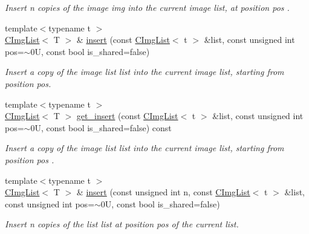 \begin{Indent}
\begin{DoxyCompactItemize}
\begin{DoxyCompactList}\small\item\em Insert {\ttfamily n} copies of the image {\ttfamily img} into the current image list, at position {\ttfamily pos} . \end{DoxyCompactList}\item 
{\footnotesize template$<$typename t $>$ }\\\hyperlink{structcimg__library__suffixed_1_1CImgList}{C\+Img\+List}$<$ T $>$ \& \hyperlink{structcimg__library__suffixed_1_1CImgList_a2f3f5778b146d1e2442b9a1fecf7f17b}{insert} (const \hyperlink{structcimg__library__suffixed_1_1CImgList}{C\+Img\+List}$<$ t $>$ \&list, const unsigned int pos=$\sim$0\+U, const bool is\+\_\+shared=false)
\begin{DoxyCompactList}\small\item\em Insert a copy of the image list {\ttfamily list} into the current image list, starting from position {\ttfamily pos}. \end{DoxyCompactList}\item 
\mbox{\label{structcimg__library__suffixed_1_1CImgList_a82cac44180901fd4c20dda09c8a8acf3}} 
{\footnotesize template$<$typename t $>$ }\\\hyperlink{structcimg__library__suffixed_1_1CImgList}{C\+Img\+List}$<$ T $>$ \hyperlink{structcimg__library__suffixed_1_1CImgList_a82cac44180901fd4c20dda09c8a8acf3}{get\+\_\+insert} (const \hyperlink{structcimg__library__suffixed_1_1CImgList}{C\+Img\+List}$<$ t $>$ \&list, const unsigned int pos=$\sim$0\+U, const bool is\+\_\+shared=false) const
\begin{DoxyCompactList}\small\item\em Insert a copy of the image list {\ttfamily list} into the current image list, starting from position {\ttfamily pos} . \end{DoxyCompactList}\item 
{\footnotesize template$<$typename t $>$ }\\\hyperlink{structcimg__library__suffixed_1_1CImgList}{C\+Img\+List}$<$ T $>$ \& \hyperlink{structcimg__library__suffixed_1_1CImgList_aac087528b5f6937c2afbbd2355e8b6a4}{insert} (const unsigned int n, const \hyperlink{structcimg__library__suffixed_1_1CImgList}{C\+Img\+List}$<$ t $>$ \&list, const unsigned int pos=$\sim$0\+U, const bool is\+\_\+shared=false)
\begin{DoxyCompactList}\small\item\em Insert n copies of the list {\ttfamily list} at position {\ttfamily pos} of the current list. \end{DoxyCompactList}\item 

\end{DoxyCompactItemize}
\end{Indent}
